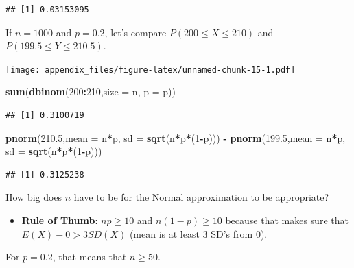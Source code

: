 \documentclass[
]{book}
\newenvironment{Shaded}{\begin{snugshade}}{\end{snugshade}}
\newcommand{\AttributeTok}[1]{\textcolor[rgb]{0.13,0.29,0.53}{#1}}
\newcommand{\DecValTok}[1]{\textcolor[rgb]{0.00,0.00,0.81}{#1}}
\newcommand{\FloatTok}[1]{\textcolor[rgb]{0.00,0.00,0.81}{#1}}
\newcommand{\FunctionTok}[1]{\textcolor[rgb]{0.13,0.29,0.53}{\textbf{#1}}}
\newcommand{\NormalTok}[1]{#1}
\newcommand{\SpecialCharTok}[1]{\textcolor[rgb]{0.81,0.36,0.00}{\textbf{#1}}}
\providecommand{\tightlist}{%
  \setlength{\itemsep}{0pt}\setlength{\parskip}{0pt}}
\begin{document}
\begin{verbatim}
## [1] 0.03153095
\end{verbatim}

If \(n=1000\) and \(p=0.2\), let's compare \(P(200\leq X\leq 210)\) and \(P(199.5\leq Y\leq 210.5)\).

\texttt{[image: appendix\_files/figure-latex/unnamed-chunk-15-1.pdf]}

\begin{Shaded}
\begin{Highlighting}[]
\FunctionTok{sum}\NormalTok{(}\FunctionTok{dbinom}\NormalTok{(}\DecValTok{200}\SpecialCharTok{:}\DecValTok{210}\NormalTok{,}\AttributeTok{size =}\NormalTok{ n, }\AttributeTok{p =}\NormalTok{ p))}
\end{Highlighting}
\end{Shaded}

\begin{verbatim}
## [1] 0.3100719
\end{verbatim}

\begin{Shaded}
\begin{Highlighting}[]
\FunctionTok{pnorm}\NormalTok{(}\FloatTok{210.5}\NormalTok{,}\AttributeTok{mean =}\NormalTok{ n}\SpecialCharTok{*}\NormalTok{p, }\AttributeTok{sd =} \FunctionTok{sqrt}\NormalTok{(n}\SpecialCharTok{*}\NormalTok{p}\SpecialCharTok{*}\NormalTok{(}\DecValTok{1}\SpecialCharTok{{-}}\NormalTok{p))) }\SpecialCharTok{{-}} \FunctionTok{pnorm}\NormalTok{(}\FloatTok{199.5}\NormalTok{,}\AttributeTok{mean =}\NormalTok{ n}\SpecialCharTok{*}\NormalTok{p, }\AttributeTok{sd =} \FunctionTok{sqrt}\NormalTok{(n}\SpecialCharTok{*}\NormalTok{p}\SpecialCharTok{*}\NormalTok{(}\DecValTok{1}\SpecialCharTok{{-}}\NormalTok{p)))}
\end{Highlighting}
\end{Shaded}

\begin{verbatim}
## [1] 0.3125238
\end{verbatim}

How big does \(n\) have to be for the Normal approximation to be appropriate?

\begin{itemize}
\tightlist
\item
  \textbf{Rule of Thumb}: \(np \geq 10\) and \(n(1-p)\geq 10\) because that makes sure that \(E(X)-0>3SD(X)\) (mean is at least 3 SD's from 0).
\end{itemize}

For \(p=0.2\), that means that \(n\geq 50\).
\end{document}
